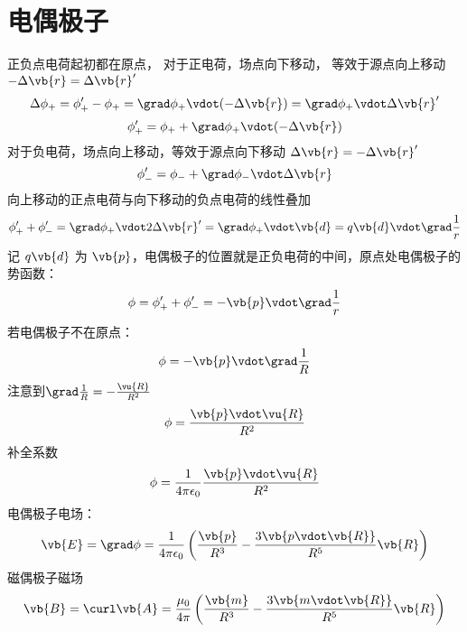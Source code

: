 
\section{电偶极子}%
正负点电荷起初都在原点，
对于正电荷，场点向下移动，
等效于源点向上移动\(-\Delta \vb{r} = \Delta \vb{r}'\)
\begin{equation*}
	\Delta \phi_+=\phi'_+ - \phi_+ =
	\grad \phi_+ \vdot (-\Delta \vb{r})
	=\grad \phi_+ \vdot \Delta \vb{r}'
\end{equation*}
\begin{equation*}
	\phi'_+ = \phi_+ +
	\grad \phi_+ \vdot (-\Delta \vb{r})
\end{equation*}
对于负电荷，场点向上移动，等效于源点向下移动
\(\Delta \vb{r} = - \Delta \vb{r}'\)
\begin{equation*}
	\phi'_- =
	\phi_- + \grad \phi_- \vdot \Delta \vb{r}
\end{equation*}
向上移动的正点电荷与向下移动的负点电荷的线性叠加
\begin{equation*}
	\phi_+' + \phi_-' = 
	\grad \phi_+ \vdot 2 \Delta \vb{r}'
	=
	\grad \phi_+ \vdot \vb{d}
	=
	q \vb{d}  \vdot \grad \frac{1}{r}
\end{equation*}
记 \(q\vb{d}\) 为 \(\vb{p}\)，电偶极子的位置就是正负电荷的中间，原点处电偶极子的势函数：
\begin{equation*}
	\phi = \phi_+' + \phi_-' = 
	-\vb{p} \vdot \grad \frac{1}{r}
\end{equation*}
若电偶极子不在原点：
\begin{equation*}
	\phi =
	- \vb{p} \vdot \grad \frac{1}{R}
\end{equation*}
注意到\(\grad \frac{1}{R} = - \frac{\vu{R}}{R^2}\)
\begin{equation*}
	\phi =
	 \frac{\vb{p} \vdot \vu{R}}{R^2}
\end{equation*}
补全系数
\begin{equation}
	\phi =
  \frac{1}{4 \pi \epsilon_0}
	 \frac{\vb{p} \vdot \vu{R}}{R^2}
\end{equation}
电偶极子电场：
\begin{equation}
  \vb{E} = \grad \phi= \frac{1}{4 \pi \epsilon_0} \left( \frac{\vb{p}}{R^3} - \frac{3\vb{p \vdot \vb{R}}}{R^5} \vb{R}\right)
\end{equation}
磁偶极子磁场
\begin{equation}
  \vb{B} = \curl \vb{A}= \frac{\mu_0}{4 \pi} \left( \frac{\vb{m}}{R^3} - \frac{3\vb{m \vdot \vb{R}}}{R^5} \vb{R}\right) 
\end{equation}
